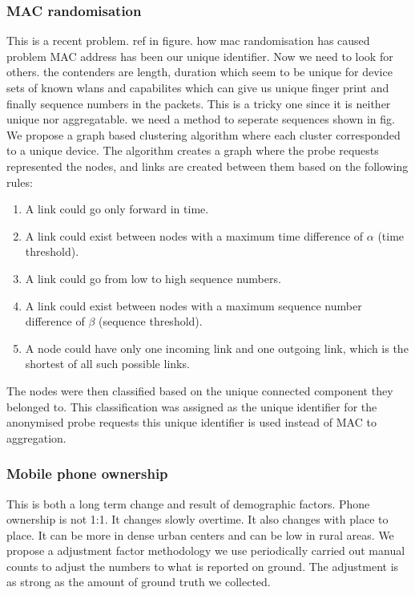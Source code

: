 \subsubsection{MAC randomisation}
This is a recent problem. ref in figure. how mac randomisation has caused problem
MAC address has been our unique identifier. Now we need to look for others.
the contenders are length, duration which seem to be unique for device
sets of known wlans and capabilites which can give us unique finger print and 
finally sequence numbers in the packets.
This is a tricky one since it is neither unique nor aggregatable.
we need a method to seperate sequences shown in fig.
We propose a graph based clustering algorithm where
each cluster corresponded to a unique device.
The algorithm creates a graph where the probe requests represented the nodes, 
and links are created between them based on the following rules: 
\begin{enumerate}
	\item A link could go only forward in time. 
	\item A link could exist between nodes with a maximum
		time difference of $\alpha$ (time threshold).
	\item A link could go from low to high sequence numbers.
	\item A link could exist between nodes with a maximum sequence
		number difference of $\beta$ (sequence threshold).
	\item A node could have only one incoming link and
		one outgoing link, which is the
		shortest of all such possible links.
\end{enumerate}
The nodes were then classified based on the unique connected component they belonged to.
This classification was assigned as the unique identifier for the anonymised probe requests
this unique identifier is used instead of MAC to aggregation.

\subsubsection{Mobile phone ownership}
This is both a long term change and result of demographic factors.
Phone ownership is not 1:1. It changes slowly overtime. It also changes
with place to place. It can be more in dense urban centers
and can be low in rural areas. We propose a adjustment factor methodology
we use periodically carried out manual counts to adjust the numbers
to what is reported on ground. The adjustment is as strong as the amount of
ground truth we collected.
